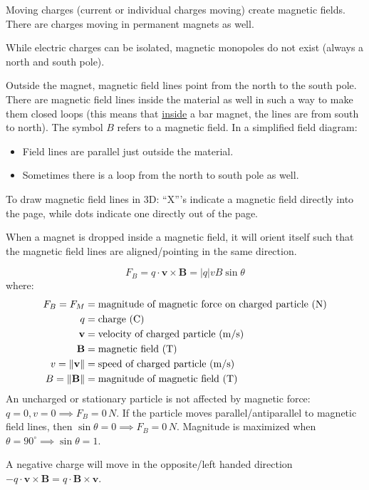 \documentclass{article}
\newcommand{\theorem}[2]{\begin{tcolorbox}[title={#1},colback=blue!5!white,colframe=blue!75!black,parbox=false] #2 \end{tcolorbox}}
\begin{document}
Moving charges (current or individual charges  moving) create magnetic fields. There are charges moving in permanent magnets as well.

While electric charges can be isolated, magnetic monopoles do not exist (always a north and south pole).

Outside the magnet, magnetic field lines point from the north to the south pole. There are magnetic field lines inside the material as well in such a way to make them closed loops (this means that \ul{inside} a bar magnet, the lines are from south to north). The symbol $B$ refers to a magnetic field. In a simplified field diagram:
\begin{itemize}
	\item Field lines are parallel just outside the material.
	\item Sometimes there is a loop from the north to south pole as well.
\end{itemize}
To draw magnetic field lines in 3D: ``X'''s indicate a magnetic field directly into the page, while dots indicate one directly out of the page.

When a magnet is dropped inside a magnetic field, it will orient itself such that the magnetic field lines are aligned/pointing in the same direction.

\theorem{Magnetic force}{
	\begin{equation*}
	    F_B=q\cdot \mathbf{v}\times \mathbf{B}=\left|q\right|vB\sin\theta
	\end{equation*}
	where:
	\begin{align*}
		F_B=F_M&=\text{magnitude of magnetic force on charged particle (N)} \\
		q&=\text{charge (C)} \\
		\mathbf v&=\text{velocity of charged particle (\si{m/s})} \\
		\mathbf B&=\text{magnetic field (T)} \\
		v=\lVert \textbf{v} \rVert&= \text{speed of charged particle (\si{m/s})} \\
		B=\lVert \textbf{B} \rVert&= \text{magnitude of magnetic field (T)}
	\end{align*}
	An uncharged or stationary particle is not affected by magnetic force: $q=0,v=0\implies F_B=0\,{N}$. If the particle moves parallel/antiparallel to magnetic field lines, then $\sin\theta=0\implies F_B=0\,\si{N}$. Magnitude is maximized when $\theta=90^\circ\implies\sin\theta=1$.

	A negative charge will move in the opposite/left handed direction $-q\cdot \mathbf{v}\times\mathbf{B}=q\cdot\mathbf{B}\times\mathbf{v}$.
}
\end{document}
